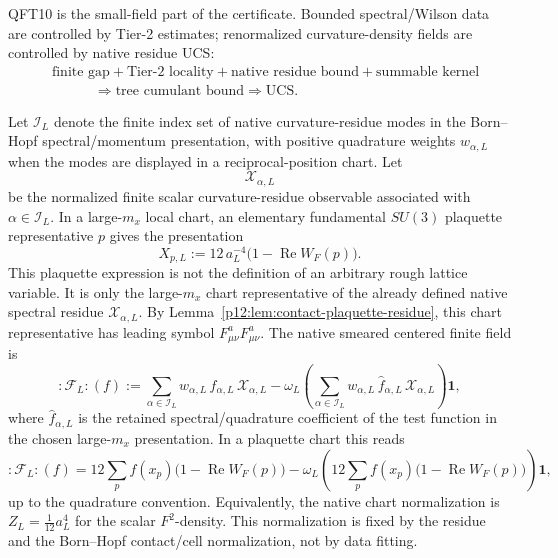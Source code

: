 \documentclass[12pt,a4paper]{article}
\begin{document}
QFT10 is the small-field part of the certificate.  Bounded spectral/Wilson data are controlled by Tier-2 estimates; renormalized curvature-density fields are controlled by native residue UCS:
\[
\begin{aligned}
&\text{finite gap}+\text{Tier-2 locality}
 +\text{native residue bound}+\text{summable kernel}\\
&\hspace{3em}\Longrightarrow \text{tree cumulant bound}
\Longrightarrow \text{UCS}.
\end{aligned}
\]
\begin{definition}
\label{p12:def:normalized-wilson-residue}
Let \(\mathcal I_L\) denote the finite index set of native curvature-residue modes in the Born--Hopf spectral/momentum presentation, with positive quadrature weights \(w_{\alpha,L}\) when the modes are displayed in a reciprocal-position chart.  Let
\[
\mathcal X_{\alpha,L}
\]
be the normalized finite scalar curvature-residue observable associated with \(\alpha\in\mathcal I_L\).  In a large-\(m_x\) local chart, an elementary fundamental \(SU(3)\) plaquette representative \(p\) gives the presentation
\begin{equation}
\label{p12:eq:normalized-wilson-residue}
X_{p,L}:=12\,a_L^{-4}\bigl(1-\operatorname{Re}W_F(p)\bigr).
\end{equation}
This plaquette expression is not the definition of an arbitrary rough lattice variable.  It is only the large-\(m_x\) chart representative of the already defined native spectral residue \(\mathcal X_{\alpha,L}\).  By Lemma~\ref{p12:lem:contact-plaquette-residue}, this chart representative has leading symbol \(F^a_{\mu\nu}F^a_{\mu\nu}\).  The native smeared centered finite field is
\begin{equation}
\label{p12:eq:centered-smeared-wilson-residue}
:\!\mathcal F_L\!:(f)
:=
\sum_{\alpha\in\mathcal I_L}w_{\alpha,L}\,\widehat f_{\alpha,L}\,\mathcal X_{\alpha,L}
-
\omega_L\!\left(
\sum_{\alpha\in\mathcal I_L}w_{\alpha,L}\,\widehat f_{\alpha,L}\,\mathcal X_{\alpha,L}
\right)\mathbf1 ,
\end{equation}
where \(\widehat f_{\alpha,L}\) is the retained spectral/quadrature coefficient of the test function in the chosen large-\(m_x\) presentation.  In a plaquette chart this reads
\[
:\!\mathcal F_L\!:(f)
=
12\sum_{p} f(x_p)\bigl(1-\operatorname{Re}W_F(p)\bigr)
-
\omega_L\!\left(12\sum_p f(x_p)\bigl(1-\operatorname{Re}W_F(p)\bigr)\right)\mathbf1 ,
\]
up to the quadrature convention.  Equivalently, the native chart normalization is \(Z_L=\frac1{12}a_L^4\) for the scalar \(F^2\)-density.  This normalization is fixed by the residue and the Born--Hopf contact/cell normalization, not by data fitting.
\end{definition}
\end{document}
